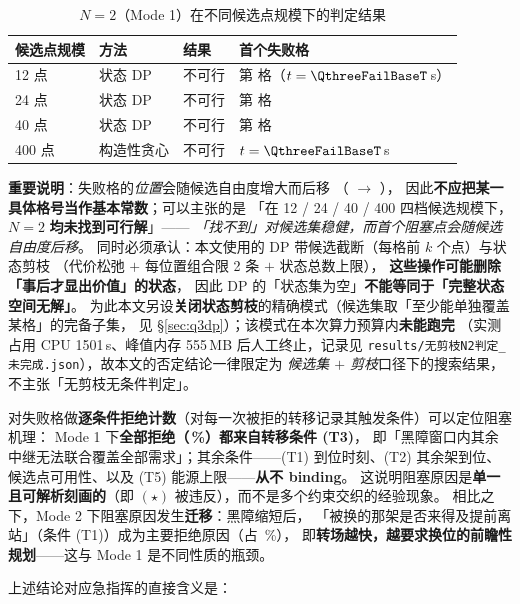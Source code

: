 \documentclass[12pt,a4paper,fontset=windows]{ctexart}
\begin{document}
\begin{table}[htbp]
\centering
\caption{$N=2$（Mode 1）在不同候选点规模下的判定结果}
\label{tab:q3robust}
\small
\begin{tabular}{llll}
\toprule
候选点规模 & 方法 & 结果 & 首个失败格 \\
\midrule
12 点 & 状态 DP & 不可行 & 第 \QthreeFailCellLow{} 格（$t=\QthreeFailBaseT$\,s）\\
24 点 & 状态 DP & 不可行 & 第 \QthreeFailCellHigh{} 格 \\
40 点 & 状态 DP & 不可行 & 第 \QthreeFailCellHigh{} 格 \\
400 点 & 构造性贪心 & 不可行 & $t=\QthreeFailBaseT$\,s \\
\bottomrule
\end{tabular}

\vspace{2pt}
\footnotesize\textbf{重要说明}：失败格的\emph{位置}会随候选自由度增大而后移
（\QthreeFailCellLow{} $\to$ \QthreeFailCellHigh{}），
因此\textbf{不应把某一具体格号当作基本常数}；可以主张的是
「在 12 / 24 / 40 / 400 四档候选规模下，$N=2$ \textbf{均未找到可行解}」——
\emph{「找不到」对候选集稳健，而首个阻塞点会随候选自由度后移}。
同时必须承认：本文使用的 DP 带候选截断（每格前 $k$ 个点）与状态剪枝
（代价松弛 $+$ 每位置组合限 2 条 $+$ 状态总数上限），
\textbf{这些操作可能删除「事后才显出价值」的状态}，
因此 DP 的「状态集为空」\textbf{不能等同于「完整状态空间无解」}。
为此本文另设\textbf{关闭状态剪枝}的精确模式（候选集取「至少能单独覆盖某格」的完备子集，
见 \S\ref{sec:q3dp}）；该模式在本次算力预算内\textbf{未能跑完}
（实测占用 CPU 1501\,s、峰值内存 555\,MB 后人工终止，记录见
\texttt{results/无剪枝N2判定\_未完成.json}），故本文的否定结论一律限定为
\emph{候选集 $+$ 剪枝}口径下的搜索结果，不主张「无剪枝无条件判定」。
\end{table}

对失败格做\textbf{逐条件拒绝计数}（对每一次被拒的转移记录其触发条件）可以定位阻塞机理：
Mode 1 下\textbf{全部拒绝（\QthreeRejUnionPct\,\%）都来自转移条件 (T3)}，
即「黑障窗口内其余中继无法联合覆盖全部需求」；其余条件——(T1) 到位时刻、(T2) 其余架到位、
候选点可用性、以及 (T5) 能源上限——\textbf{从不 binding}。
这说明阻塞原因是\textbf{单一且可解析刻画的}（即 $(\star)$ 被违反），而不是多个约束交织的经验现象。
相比之下，Mode 2 下阻塞原因发生\textbf{迁移}：黑障缩短后，
「被换的那架是否来得及提前离站」（条件 (T1)）成为主要拒绝原因（占 \QthreeRejArrivalPct\,\%），
即\textbf{转场越快，越要求换位的前瞻性规划}——这与 Mode 1 是不同性质的瓶颈。


上述结论对应急指挥的直接含义是：
\end{document}

